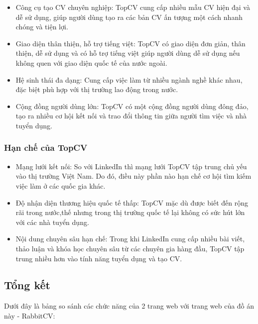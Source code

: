 \begin{itemize}
	\item Công cụ tạo CV chuyên nghiệp: TopCV cung cấp nhiều mẫu CV hiện đại và dễ sử dụng, giúp người dùng tạo ra các bản CV ấn tượng một cách nhanh chóng và tiện lợi.
	\item Giao diện thân thiện, hỗ trợ tiếng việt: TopCV có giao diện đơn giản, thân thiện, dễ sử dụng và có hỗ trợ tiếng việt giúp người dùng  dễ sử dụng nếu không quen với giao diện quốc tế của nước ngoài.
	\item Hệ sinh thái đa dạng: Cung cấp việc làm từ nhiều ngành nghề khác nhau, đặc biệt phù hợp với thị trường lao động trong nước.
	\item Cộng đồng người dùng lớn: TopCV có một cộng đồng người dùng đông đảo, tạo ra nhiều cơ hội kết nối và trao đổi thông tin giữa người tìm việc và nhà tuyển dụng.
\end{itemize}


\subsubsection{Hạn chế của TopCV}

\begin{itemize}
	\item Mạng lưới kết nối: So với LinkedIn thì mạng lưới TopCV tập trung chủ yếu vào thị trường Việt Nam. Do đó, điều này phần nào hạn chế cơ hội tìm kiếm việc làm ở các quốc gia khác.
	\item Độ nhận diện thương hiệu quốc tế thấp: TopCV mặc dù được biết đến rộng rãi trong nước,thế nhưng trong thị trường quốc tế lại không có sức hút lớn với các nhà tuyển dụng.
	\item Nội dung chuyên sâu hạn chế: Trong khi LinkedIn cung cấp nhiều bài viết, thảo luận và khóa học chuyên sâu từ các chuyên gia hàng đầu, TopCV tập trung nhiều hơn vào tính năng tuyển dụng và tạo CV.
\end{itemize}


\subsection{Tổng kết}

Dưới đây là bảng so sánh các chức năng của 2 trang web với trang web của đồ án này - RabbitCV:

